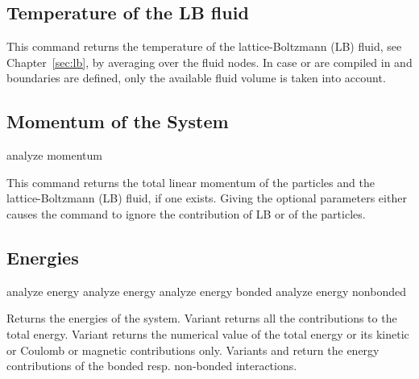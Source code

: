 \subsection{Temperature of the LB fluid}
\label{analyze:lbtemp}

\begin{essyntax}
  \begin{features}
  \end{features}
\end{essyntax}

This command returns the temperature of the lattice-Boltzmann (LB)
fluid, see Chapter~\ref{sec:lb}, by averaging over the fluid nodes. In
case  or  are
compiled in and boundaries are defined, only the available fluid
volume is taken into account.

\subsection{Momentum of the System}
\label{analyze:momentum}
\begin{pysyntax}
\end{pysyntax}
\begin{essyntax}
    analyze momentum 
\end{essyntax}
This command returns the total linear momentum of the particles and the lattice-Boltzmann (LB) fluid, if one exists. Giving the optional parameters either
causes the command to ignore the contribution of LB or of the particles.

\subsection{Energies}
\label{analyze:energy}

\begin{essyntax}
   analyze energy
   analyze energy 
   analyze energy bonded 
   analyze energy nonbonded  
\end{essyntax}
Returns the energies of the system. Variant  returns all
the contributions to the total energy. Variant  returns the
numerical value of the total energy or its kinetic or Coulomb or magnetic
contributions only. Variants  and  return the
energy contributions of the bonded resp. non-bonded interactions.

